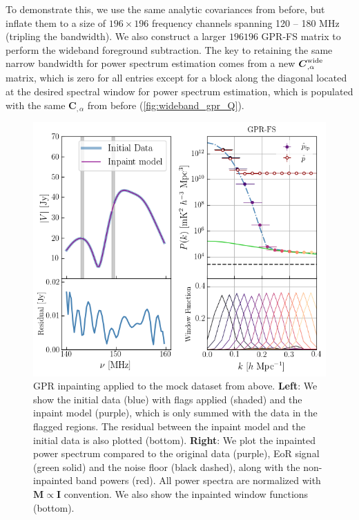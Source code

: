 \documentclass[a4paper,fleqn,usenatbib]{mnras}
\def\R{\boldsymbol{R}}
\def\M{\boldsymbol{M}}
\def\C{\boldsymbol{C}}
\def\I{\boldsymbol{I}}
\begin{document}
To demonstrate this, we use the same analytic covariances from before, but inflate them to a size of $196\times196$ frequency channels spanning 120 -- 180 MHz (tripling the bandwidth).
We also construct a larger $196196$ GPR-FS matrix to perform the wideband foreground subtraction.
The key to retaining the same narrow bandwidth for power spectrum estimation comes from a new $\C_{,\alpha}^{\rm wide}$ matrix, which is zero for all entries except for a block along the diagonal located at the desired spectral window for power spectrum estimation, which is populated with the same $\C_{,\alpha}$ from before (\autoref{fig:wideband_gpr_Q}).



\begin{figure}
\centering
\includegraphics[scale=0.5]{imgs/gpr_low_noise_inpainting}
\caption{GPR inpainting applied to the mock dataset from above. {\bfseries Left}: We show the initial data (blue) with flags applied (shaded) and the inpaint model (purple), which is only summed with the data in the flagged regions. The residual between the inpaint model and the initial data is also plotted (bottom). {\bfseries Right}: We plot the inpainted power spectrum compared to the original data (purple), EoR signal (green solid) and the noise floor (black dashed), along with the non-inpainted band powers (red). All power spectra are normalized with $\M\propto\I$ convention. We also show the inpainted window functions (bottom). }
\label{fig:gpr_low_noise_inpainting}
\end{figure}
\end{document}
